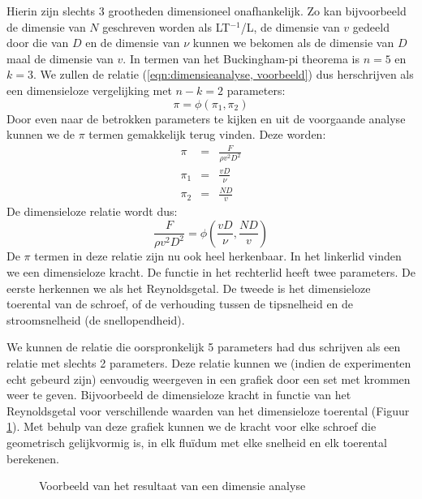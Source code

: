 Hierin zijn slechts 3 grootheden dimensioneel onafhankelijk. Zo kan bijvoorbeeld de dimensie van $N$ geschreven worden als LT$^{-1}$/L, de dimensie van $v$ gedeeld door die van $D$ en de dimensie van $\nu$ kunnen we bekomen als de dimensie van $D$ maal de dimensie van $v$.  In termen van het Buckingham-pi theorema is $n=5$ en $k=3$. We zullen de relatie (\ref{eqn:dimensieanalyse, voorbeeld}) dus herschrijven als een dimensieloze vergelijking met $n-k=2$ parameters:
\begin{equation}
	\pi = \phi(\pi_1,\pi_2)
\end{equation}
Door even naar de betrokken parameters te kijken en uit de voorgaande analyse kunnen we de $\pi$ termen gemakkelijk terug vinden. Deze worden:
\begin{eqnarray}
	\pi &=& \frac{F}{\rho v^2 D^2}  \nonumber \\
	\pi_1 &=& \frac{v D}{\nu} \\
	\pi_2 &=& \frac{N D}{v} \nonumber
\end{eqnarray}
De dimensieloze relatie wordt dus:
\begin{equation}
	\frac{F}{\rho v^2 D^2} = \phi(\frac{v D}{\nu},\frac{N D}{v})
\end{equation}
De $\pi$ termen in deze relatie zijn nu ook heel herkenbaar. In het linkerlid vinden we een dimensieloze kracht. De functie in het rechterlid heeft twee parameters. De eerste herkennen we als het Reynoldsgetal. De tweede is het dimensieloze toerental van de schroef, of de verhouding tussen de tipsnelheid en de stroomsnelheid (de snellopendheid).

We kunnen de relatie die oorspronkelijk 5 parameters had dus schrijven als een relatie met slechts 2 parameters. Deze relatie kunnen we (indien de experimenten echt gebeurd zijn) eenvoudig weergeven in een grafiek door een set met krommen weer te geven. Bijvoorbeeld de dimensieloze kracht in functie van het Reynoldsgetal voor verschillende waarden van het dimensieloze toerental (Figuur \ref{fig:dimensieanalysevoorbeeld}). Met behulp van deze grafiek kunnen we de kracht voor elke schroef die geometrisch gelijkvormig is, in elk fluïdum met elke snelheid en elk toerental berekenen.
\begin{figure}[htb]
	\centering
	
	\caption{Voorbeeld van het resultaat van een dimensie analyse}
	\label{fig:dimensieanalysevoorbeeld}
\end{figure}